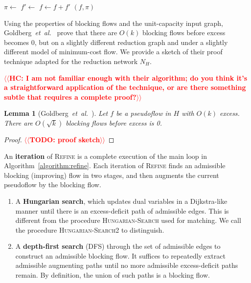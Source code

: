 \documentclass[11pt]{article}
\makeatletter
\def\etal{\textit{et~al.}}
\theoremstyle{plain}
\newtheorem{lemma}{Lemma}[section]
\numberwithin{figure}{section}
\def\EMPH#1{\textbf{\boldmath #1}}
\def\n@te#1{\textsf{\boldmath \textbf{$\langle\!\langle$#1$\rangle\!\rangle$}}\leavevmode}
\def\note#1{\textcolor{red}{\n@te{#1}}}
\makeatother
\begin{document}
\begin{figure*}[ht]
\centering
\begin{minipage}{.8\linewidth}
\begin{algorithm}[H]
\caption{Refinement}
\label{algorithm:refine}
\begin{algorithmic}[1]
		\State $\pi \gets$ 
		\State $f' \gets$ 
		\State $f \gets f + f'$
	\EndWhile
	\State\Return $(f, \pi)$
\EndFunction
\end{algorithmic}
\end{algorithm}
\end{minipage}
\end{figure*}

Using the properties of blocking flows and the unit-capacity input graph,
Goldberg~{\etal}~\cite{GHKT17} prove that there are $O(k)$ blocking
flows before excess becomes 0, but on a slightly different reduction graph
and under a slightly different model of minimum-cost flow.
We provide a sketch of their proof technique adapted for the reduction network
$N_H$.

\note{HC: I am not familiar enough with their algorithm; do you think it's a straightforward application of the technique, or are there something subtle that requires a complete proof?}

\begin{lemma}[Goldberg~{\etal}~{\cite[Lemma~3.11 and \S{6}]{GHKT17}}]
\label{lemma:goldberg_refine_iterations}
Let $f$ be a pseudoflow in $H$ with $O(k)$ excess.
There are $O(\sqrt{k})$ blocking flows before excess is 0.
\end{lemma}

\begin{proof}
\note{TODO: proof sketch}%
\end{proof}

An \EMPH{iteration} of \textsc{Refine} is a complete execution of the main loop
in Algorithm~\ref{algorithm:refine}.
Each iteration of \textsc{Refine} finds an admissible blocking (improving) flow
in two stages, and then augments the current pseudoflow by the blocking flow.
\begin{enumerate}
\item A \EMPH{Hungarian search}, which updates dual variables in a Dijkstra-like
	manner until there is an excess-deficit path of admissible edges.
	This is different from the procedure \textsc{Hungarian-Search} used for
	matching.
	We call the procedure \textsc{Hungarian-Search2} to distinguish.
\item A \EMPH{depth-first search} (\textsc{DFS}) through the set of admissible
	edges to construct an admissible blocking flow.
	It suffices to repeatedly extract admissible augmenting paths until
	no more admissible excess-deficit paths remain.
	By definition, the union of such paths is a blocking flow.
\end{enumerate}
\end{document}
